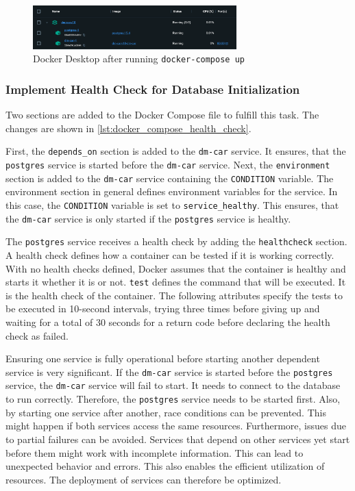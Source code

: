 \begin{figure}
    \centering
    \includegraphics[width=0.7\textwidth]{figures/microservices/dmCar/ms_dmCar_dockerComposePostgres.png}
    \caption{Docker Desktop after running \texttt{docker-compose up}}
    \label{fig:docker_compose_up}
\end{figure}

\subsubsection*{Implement Health Check for Database Initialization}
Two sections are added to the Docker Compose file to fulfill this task.
The changes are shown in \autoref*{lst:docker_compose_health_check}.

First, the \texttt{depends\_on} section is added to the \texttt{dm-car} service.
It ensures, that the \texttt{postgres} service is started before the \texttt{dm-car} service.
Next, the \texttt{environment} section is added to the \texttt{dm-car} service containing the \texttt{CONDITION} variable.
The environment section in general defines environment variables for the service.
In this case, the \texttt{CONDITION} variable is set to \texttt{service\_healthy}.
This ensures, that the \texttt{dm-car} service is only started if the \texttt{postgres} service is healthy.

The \texttt{postgres} service receives a health check by adding the \texttt{healthcheck} section.
A health check defines how a container can be tested if it is working correctly.
With no health checks defined, Docker assumes that the container is healthy and starts it whether it is or not.
\texttt{test} defines the command that will be executed.
It is the health check of the container.
The following attributes specify the tests to be executed in 10-second intervals, trying three times before giving up and waiting for a total of 30 seconds for a return code before declaring the health check as failed.

Ensuring one service is fully operational before starting another dependent service is very significant.
If the \texttt{dm-car} service is started before the \texttt{postgres} service, the \texttt{dm-car} service will fail to start.
It needs to connect to the database to run correctly.
Therefore, the \texttt{postgres} service needs to be started first.
Also, by starting one service after another, race conditions can be prevented.
This might happen if both services access the same resources.
Furthermore, issues due to partial failures can be avoided.
Services that depend on other services yet start before them might work with incomplete information.
This can lead to unexpected behavior and errors.
This also enables the efficient utilization of resources.
The deployment of services can therefore be optimized.

